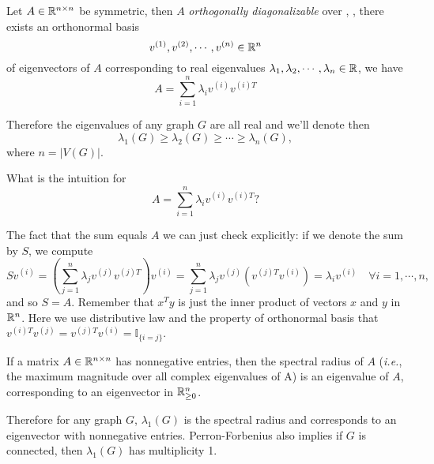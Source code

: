 \begin{theorem}
\label{thm1.1}
Let \(A\in\mathbb{R}^{n\times n}\) be symmetric, then \(A\) \emph{orthogonally diagonalizable} over \R, ,
there exists an orthonormal basis
\[ v^{(1)}, v^{(2)},\cdots,v^{(n)}\in\mathbb{R}^n \]
of eigenvectors of \(A\) corresponding to real eigenvalues \(\lambda_1,\lambda_2,\cdots,\lambda_n\in\mathbb{R}\), we have
\[A=\sum_{i=1}^{n}\lambda_i v^{(i)}v^{(i)T} \]
\end{theorem}

Therefore the eigenvalues of any graph \(G\) are all real and we'll denote then
\[ \lambda_1(G)\geq\lambda_2(G)\geq\cdots\geq\lambda_n(G), \]
where \(n=|V(G)|\).

\begin{question}
What is the intuition for
\[A=\sum_{i=1}^{n}\lambda_i v^{(i)}v^{(i)T} ? \]
\end{question}
\begin{answer}
The fact that the sum equals \(A\) we can just check explicitly:
if we denote the sum by \(S\), we compute 
\[S v^{(i)} = \left(\sum_{j=1}^{n}\lambda_j v^{(j)}v^{(j)T}\right)v^{(i)} = \sum_{j=1}^{n}\lambda_j v^{(j)}\left(v^{(j)T}v^{(i)}\right) = \lambda_i v^{(i)} \quad \forall i=1,\cdots,n,\]
and so \(S = A\).
Remember that \(x^Ty\) is just the inner product of vectors \(x\) and \(y\) in \(\mathbb{R}^n\).
Here we use distributive law and the property of orthonormal basis that \(v^{(i)T}v^{(j)}=v^{(j)T}v^{(i)}=\mathbb{I}_{\{i=j\}}\).
\end{answer}



\begin{theorem}
If a matrix \(A\in\mathbb{R}^{n\times n}\) has nonnegative entries, then the spectral radius of \(A\) (\textit{i.e.}, the maximum magnitude over all complex eigenvalues of A) is an eigenvalue of \(A\), corresponding to an eigenvector in \(\mathbb{R}_{\ge0}^n\).
\end{theorem}
Therefore for any graph \(G\), \(\lambda_1(G)\) is the spectral radius and corresponds to an eigenvector with nonnegative entries.
Perron-Forbenius also implies if \(G\) is connected, then \(\lambda_1(G)\) has multiplicity 1.


